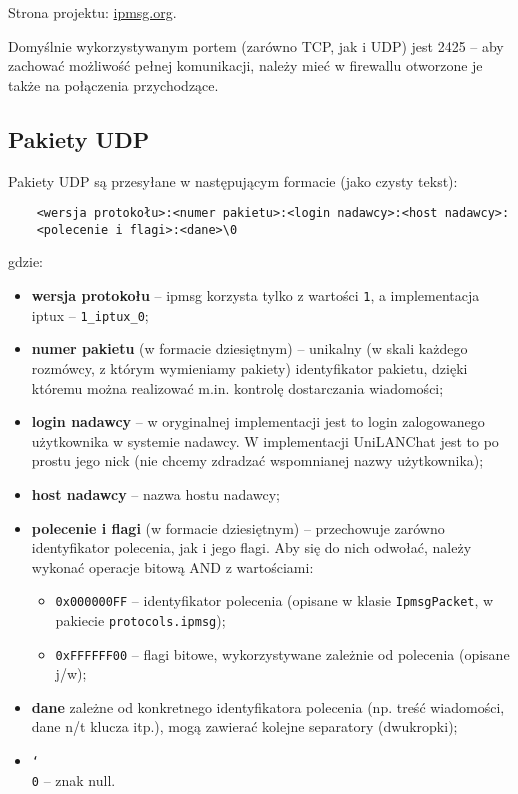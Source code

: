 \documentclass[11pt,leqno]{article}
\newcommand\BSLASH{\char`\\}
\begin{document}
Strona projektu: \href{http://ipmsg.org}{ipmsg.org}.

Domyślnie wykorzystywanym portem (zarówno TCP, jak i UDP) jest 2425 -- aby zachować możliwość
pełnej komunikacji, należy mieć w firewallu otworzone je także na połączenia przychodzące.

\subsection{Pakiety UDP}

Pakiety UDP są przesyłane w następującym formacie (jako czysty tekst):
\begin{verbatim}
	<wersja protokołu>:<numer pakietu>:<login nadawcy>:<host nadawcy>:
	<polecenie i flagi>:<dane>\0
\end{verbatim}
gdzie:
\begin{itemize}
	\item \textbf{wersja protokołu} -- ipmsg korzysta tylko z wartości \texttt{1}, a implementacja
	iptux -- \texttt{1\_iptux\_0};
	\item \textbf{numer pakietu} (w formacie dziesiętnym) -- unikalny (w skali każdego rozmówcy, z którym wymieniamy pakiety)
	identyfikator pakietu, dzięki któremu można realizować m.in. kontrolę dostarczania wiadomości;
	\item \textbf{login nadawcy} -- w oryginalnej implementacji jest to login zalogowanego
	użytkownika w systemie nadawcy. W implementacji UniLANChat jest to po prostu jego nick (nie
	chcemy zdradzać wspomnianej nazwy użytkownika);
	\item \textbf{host nadawcy} -- nazwa hostu nadawcy;
	\item \textbf{polecenie i flagi} (w formacie dziesiętnym) -- przechowuje zarówno identyfikator polecenia, jak i jego
	flagi. Aby się do nich odwołać, należy wykonać operacje bitową AND z wartościami:
	\begin{itemize}
		\item \texttt{0x000000FF} -- identyfikator polecenia (opisane w klasie \texttt{IpmsgPacket},
		w pakiecie \texttt{protocols.ipmsg});
		\item \texttt{0xFFFFFF00} -- flagi bitowe, wykorzystywane zależnie od polecenia (opisane j/w);
	\end{itemize}
	\item \textbf{dane} zależne od konkretnego identyfikatora polecenia (np. treść wiadomości,
	dane n/t klucza itp.), mogą zawierać kolejne separatory (dwukropki);
	\item \texttt{\BSLASH0} -- znak null.
\end{itemize}
\end{document}
